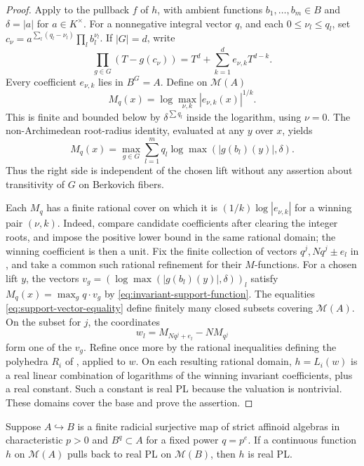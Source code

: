 \documentclass[11pt,a4paper]{amsart}
\begin{document}
\begin{proof}
Apply  to the pullback $f$ of $h$, with ambient functions $b_1,\ldots,b_m\in B$ and $\delta=|a|$ for $a\in K^\times$. For a nonnegative integral vector $q$, and each $0\leq\nu_l\leq q_l$, set $c_\nu=a^{\sum_l(q_l-\nu_l)}\prod_l b_l^{\nu_l}$. If $|G|=d$, write
\[
 \prod_{g\in G}(T-g(c_\nu))=T^d+\sum_{k=1}^d e_{\nu,k}T^{d-k}.
\]
Every coefficient $e_{\nu,k}$ lies in $B^G=A$. Define on $\mathcal M(A)$
\[
 M_q(x)=\log\max_{\nu,k}|e_{\nu,k}(x)|^{1/k}.
\]
This is finite and bounded below by $\delta^{\sum q_l}$ inside the logarithm, using $\nu=0$. The non-Archimedean root-radius identity, evaluated at any $y$ over $x$, yields
\begin{equation}\label{eq:invariant-support-function}
 M_q(x)=\max_{g\in G}\sum_{l=1}^m q_l\log\max(|g(b_l)(y)|,\delta).
\end{equation}
Thus the right side is independent of the chosen lift without any assertion about transitivity of $G$ on Berkovich fibers.

Each $M_q$ has a finite rational cover on which it is $(1/k)\log|e_{\nu,k}|$ for a winning pair $(\nu,k)$. Indeed, compare candidate coefficients after clearing the integer roots, and impose the positive lower bound in the same rational domain; the winning coefficient is then a unit. Fix the finite collection of vectors $q^j,Nq^j\pm e_l$ in , and take a common such rational refinement for their $M$-functions. For a chosen lift $y$, the vectors $v_g=(\log\max(|g(b_l)(y)|,\delta))_l$ satisfy $M_q(x)=\max_g q\cdot v_g$ by \eqref{eq:invariant-support-function}. The equalities \eqref{eq:support-vector-equality} define finitely many closed subsets covering $\mathcal M(A)$. On the subset for $j$, the coordinates
\[
 w_l=M_{Nq^j+e_l}-NM_{q^j}
\]
form one of the $v_g$. Refine once more by the rational inequalities defining the polyhedra $R_i$ of , applied to $w$. On each resulting rational domain, $h=L_i(w)$ is a real linear combination of logarithms of the winning invariant coefficients, plus a real constant. Such a constant is real PL because the valuation is nontrivial. These domains cover the base and prove the assertion.
\end{proof}

\begin{lemma}\label{lem:frobenius-descent}
Suppose $A\hookrightarrow B$ is a finite radicial surjective map of strict affinoid algebras in characteristic $p>0$ and $B^q\subset A$ for a fixed power $q=p^e$. If a continuous function $h$ on $\mathcal M(A)$ pulls back to real PL on $\mathcal M(B)$, then $h$ is real PL.
\end{lemma}
\end{document}
